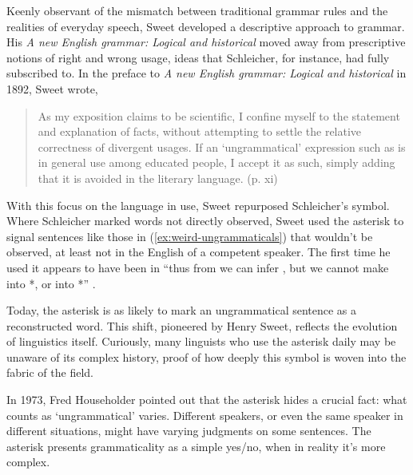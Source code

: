 
Keenly observant of the mismatch between traditional grammar rules and the realities of everyday speech, Sweet developed a descriptive approach to grammar. His \textit{A new English grammar: Logical and historical} moved away from prescriptive notions of right and wrong usage, ideas that Schleicher, for instance, had fully subscribed to. In the preface to \textit{A new English grammar: Logical and historical} in 1892, Sweet wrote,

\begin{quote}
    As my exposition claims to be scientific, I confine myself
to the statement and explanation of facts, without attempting
to settle the relative correctness of divergent usages. If an
`ungrammatical' expression such as  is in general
use among educated people, I accept it as such, simply
adding that it is avoided in the literary language. \phantom{~ }\hfill(p. xi)
\end{quote}

With this focus on the language in use, Sweet repurposed Schleicher's symbol. Where Schleicher marked words not directly observed, Sweet used the asterisk to signal sentences like those in (\ref{ex:weird-ungrammaticals}) that wouldn't be observed, at least not in the English of a competent speaker. The first time he used it appears to have been in \enquote{thus from  we can infer , but we cannot make  into *, or  into *} \citep[14]{Sweet}.

Today, the asterisk is as likely to mark an ungrammatical sentence as a reconstructed word. This shift, pioneered by Henry Sweet, reflects the evolution of linguistics itself. Curiously, many linguists who use the asterisk daily may be unaware of its complex history, proof of how deeply this symbol is woven into the fabric of the field.

\bigskip

In 1973, Fred Householder \citep{Householder1973} pointed out that the asterisk hides a crucial fact: what counts as `ungrammatical' varies. Different speakers, or even the same speaker in different situations, might have varying judgments on some sentences. The asterisk presents grammaticality as a simple yes/no, when in reality it's more complex.

